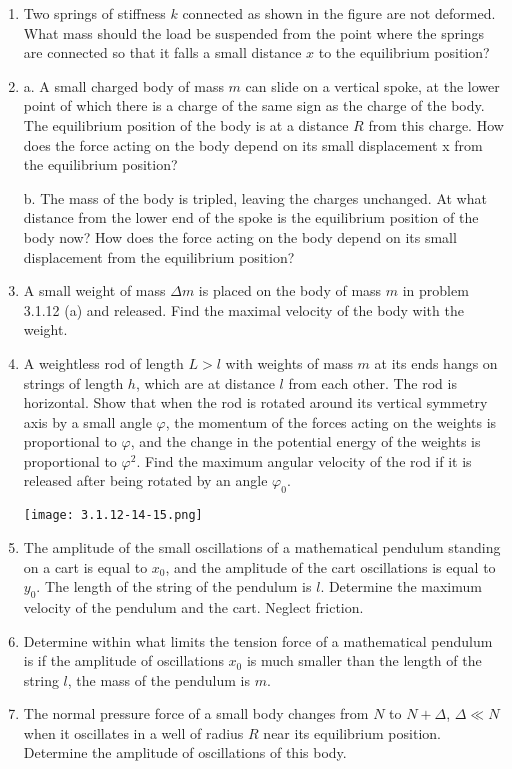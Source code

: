 \documentclass{article}
\begin{document}
\begin{enumerate}[label=3.1.\arabic*]
\item Two springs of stiffness $k$ connected as shown in the figure are not deformed. What mass should the load be suspended from the point where the springs are connected so that it falls a small distance $x$ to the equilibrium position?

\item a. A small charged body of mass $m$ can slide on a vertical spoke, at the lower point of which there is a charge of the same sign as the charge of the body. The equilibrium position of the body is at a distance $R$ from this charge. How does the force acting on the body depend on its small displacement x from the equilibrium position?

b. The mass of the body is tripled, leaving the charges unchanged. At what distance from the lower end of the spoke is the equilibrium position of the body now? How does the force acting on the body depend on its small displacement from the equilibrium position?

\item A small weight of mass $\Delta m$ is placed on the body of mass $m$ in problem 3.1.12 (a) and released. Find the maximal velocity of the body with the weight.

\item A weightless rod of length $L> l$ with weights of mass $m$ at its ends hangs on strings of length $h$, which are at distance $l$ from each other. The rod is horizontal. Show that when the rod is rotated around its vertical symmetry axis by a small angle $\varphi$, the momentum of the forces acting on the weights is proportional to $\varphi$, and the change in the potential energy of the weights is proportional to $\varphi^2$. Find the maximum angular velocity of the rod if it is released after being rotated by an angle $\varphi_0$.
\begin{center}
    \texttt{[image: 3.1.12-14-15.png]}
\end{center}

\item The amplitude of the small oscillations of a mathematical pendulum standing on a cart is equal to $x_0$, and the amplitude of the cart oscillations is equal to $y_0$. The length of the string of the pendulum is $l$. Determine the maximum velocity of the pendulum and the cart. Neglect friction.

\item Determine within what limits the tension force of a mathematical pendulum is if the amplitude of oscillations $x_0$ is much smaller than the length of the string $l$, the mass of the pendulum is $m$.
\item The normal pressure force of a small body changes from $N$ to $N + \Delta$, $\Delta \ll N$ when it oscillates in a well of radius $R$ near its equilibrium position. Determine the amplitude of oscillations of this body.




\end{enumerate}
\end{document}
